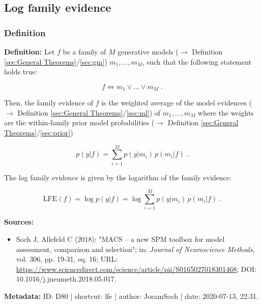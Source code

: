 \documentclass[a4paper,12pt,twoside]{book}
\begin{document}
\subsection{Log family evidence}

\subsubsection[\textit{Definition}]{Definition} \label{sec:lfe}
\setcounter{equation}{0}

\textbf{Definition:} Let $f$ be a family of $M$ generative models ($\rightarrow$ Definition \ref{sec:General Theorems}/\ref{sec:gm}) $m_1, \ldots, m_M$, such that the following statement holds true:

\begin{equation} \label{eq:lfe-fam}
f \Leftrightarrow m_1 \vee \ldots \vee m_M \; .
\end{equation}

Then, the family evidence of $f$ is the weighted average of the model evidences ($\rightarrow$ Definition \ref{sec:General Theorems}/\ref{sec:ml}) of $m_1, \ldots, m_M$ where the weights are the within-family prior model probabilities ($\rightarrow$ Definition \ref{sec:General Theorems}/\ref{sec:prior})

\begin{equation} \label{eq:lfe-fe}
p(y|f) = \sum_{i=1}^M p(y|m_i) \, p(m_i|f) \; .
\end{equation}

The log family evidence is given by the logarithm of the family evidence:

\begin{equation} \label{eq:lfe-lfe}
\mathrm{LFE}(f) = \log p(y|f) = \log \sum_{i=1}^M p(y|m_i) \, p(m_i|f) \; .
\end{equation}


\vspace{1em}
\textbf{Sources:}
\begin{itemize}
\item Soch J, Allefeld C (2018): "MACS – a new SPM toolbox for model assessment, comparison and selection"; in: \textit{Journal of Neuroscience Methods}, vol. 306, pp. 19-31, eq. 16; URL: \url{https://www.sciencedirect.com/science/article/pii/S0165027018301468}; DOI: 10.1016/j.jneumeth.2018.05.017.
\end{itemize}


\vspace{1em}
\textbf{Metadata:} ID: D80 | shortcut: lfe | author: JoramSoch | date: 2020-07-13, 22:31.
\vspace{1em}
\end{document}
